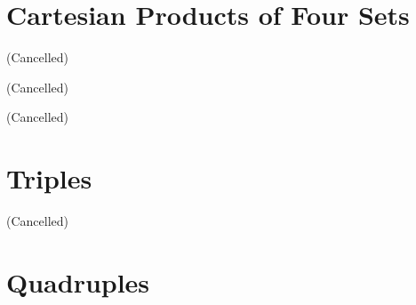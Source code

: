 \documentclass{article}
\begin{document}
\section{Cartesian Products of Four Sets}
\begin{thm}
\item\label{mcart1:49} 
\item\label{mcart1:50} 
\item\label{mcart1:51} 
\item\label{mcart1:52} 
\item\label{mcart1:53} 
\item\label{mcart1:54} 
\item\label{mcart1:55} (Cancelled)
\item\label{mcart1:56} (Cancelled)
\item\label{mcart1:57} (Cancelled)
\item\label{mcart1:58} 
\item\label{mcart1:59} 
\item\label{mcart1:60} 
\item\label{mcart1:61} 
\item\label{mcart1:62} 
\item\label{mcart1:63} 
\end{thm}

\section{Triples}

\begin{thm}
\item\label{mcart1:64} 
\item\label{mcart1:65} 
\item\label{mcart1:66} 
\item\label{mcart1:67} 
\item\label{mcart1:68} 
\item\label{mcart1:69} 
\item\label{mcart1:70} 
\item\label{mcart1:71} (Cancelled)
\item\label{mcart1:72} 
\item\label{mcart1:73} 
\end{thm}

\section{Quadruples}
\end{document}
